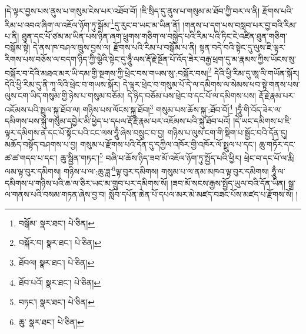 །དེ་ལྟར་བྱས་པས་ནུས་པ་གསུམ་ངེས་པར་འཐོབ་བོ། །ཇི་སྲིད་དུ་ནུས་པ་གསུམ་མ་ཐོབ་ཀྱི་བར་ལ་ནི། རྫོགས་པའི་རིམ་པ་འབའ་ཞིག་ལ་འཇོལ་ཉོག་ཏུ་སྒོམ་\footnote{བསྒོམ་  སྣར་ཐང་།  པེ་ཅིན། }དུ་རུང་བ་ཡང་མ་ཡིན་ནོ། །གནས་པ་དག་པས་བསླབ་པར་བྱ་བའི་རིམ་པ་ནི། ཐུན་དང་པོ་ཙམ་མ་ཡིན་པས་ཉིན་ཞག་ཕྲུགས་གཅིག་ལ་བསྐྱེད་པའི་རིམ་པའི་ཏིང་ངེ་འཛིན་ཐུན་གཅིག་བསྒོམ་སྟེ། དེ་ནས་ཁ་བཤལ་ཁྲུས་བྱས་ལ། རྫོགས་པའི་རིམ་པ་བསྒོམ་པ་ནི། སྟན་བདེ་བའི་སྟེང་དུ་ལུས་ཇི་ལྟར་རིགས་པས་བཅོས་ལ་བདག་ཉིད་ཀྱི་ལྕེའི་སྟེང་དུ་ཧཱུྃ་ལས་རྡོ་རྗེ་སྔོན་པོ་འོད་ཟེར་བརྒྱ་ཕྲག་དུ་མ་རྣམས་ཀྱིས་ཡོངས་སུ་བསྐོར་བ་དེའི་མཐའ་མར་ཡི་དམ་གྱི་སྔགས་ཀྱི་ཕྲེང་བས་གཡས་སུ་:བསྐོར་བས།\footnote{བསྐོར་བ།  སྣར་ཐང་།  པེ་ཅིན། } དེའི་ཕྱི་རིམ་དུ་ཨཱ་ལི་གཡོན་སྐོར། དེའི་ཕྱི་རིམ་དུ་ནི་ཀཱ་ལིའི་ཕྲེང་བ་གཡས་སྐོར། དེ་ལྟར་ཕྲེང་བ་གསུམ་པོ་དེ་ལ་དམིགས་ལ་སེམས་ཕབ་སྟེ་གནས་པས་ལུས་ངག་ཡིད་གསུམ་གྱི་ཉེས་པ་གསུམ་བཅོམ། དེ་ཉིད་བཅོམ་པས་ཕྲེང་བ་དང་པོ་ལ་དམིགས་པས། རྡོ་རྗེ་རྣམ་པར་འཇོམས་པའི་སྤྲུལ་སྐུ་ཐོབ་ལ། གཉིས་པས་ལོངས་སྐུ་ཐོབ།\footnote{ཐོབལ།  སྣར་ཐང་།  པེ་ཅིན། } གསུམ་པས་ཆོས་སྐུ་:ཐོབ་བོ།\footnote{ཐོབ་པའོ།  སྣར་ཐང་།  པེ་ཅིན། } །ཧཱུྃ་གི་འོད་ཟེར་ལ་དམིགས་པས་སྐུ་གསུམ་དབྱེར་མི་ཕྱེད་པ་དཔལ་རྡོ་རྗེ་རྣམ་པར་འཇོམས་པའི་སྐུ་ཐོབ་པའོ། །དེ་ཡང་དམིགས་པ་ཇི་ལྟར་དམིགས་ན་དང་པོ་སྟོང་པའི་ངང་ལས་ཧཱུྃ་ཞེས་བསྲུང་བ་བྱ། གཉིས་པ་ལུས་ངག་གི་སྡིག་པ་སྦྱོང་བའི་དོན་དུ། མཆོད་བསྟོད་བཤགས་པ་བྱ། གསུམ་པ་རྫོགས་པའི་དོན་དུ་དཀྱིལ་འཁོར་གྱི་འཁོར་ལོ་སྤྲུལ་པ་དང་། ཆུ་གཏོར་དང་ཚ་ཚ་གདབ་པ་དང་། ཆུ་སྦྱིན་གཏང་།\footnote{བཏང་།  སྣར་ཐང་།  པེ་ཅིན། } བཞི་པ་ཆོས་ཉིད་ཟབ་མོ་འཇོལ་ཉོག་ཏུ་སྤྱོད་པའི་ཕྱིར། ཕྲེང་བ་དང་པོ་ལ་རྨི་ལམ་ལྟ་བུར་དམིགས། གཉིས་པ་ལ་:ཆུ་ཟླ་\footnote{ཆུ་  སྣར་ཐང་།  པེ་ཅིན། }ལྟ་བུར་དམིགས། གསུམ་པ་ལ་ནམ་མཁའ་ལྟ་བུར་དམིགས། ཧཱུྃ་ལ་དམིགས་པ་གཉིས་པའི་ཆ་ལ་ཅིར་ཡང་མ་གྲུབ་པར་དམིགས་སོ། །ཟབ་མོ་སངས་རྒྱས་སྤྱོད་ཡུལ་བའི་དོན་ཡིན། སྒྲ་ལ་གནས་པའི་བསམ་གཏན་ཞེས་བྱ་བ། སློབ་དཔོན་ཆེན་པོ་དཔལ་མར་མེ་མཛད་བཟང་པོས་མཛད་པ་རྫོགས་སོ། ། 